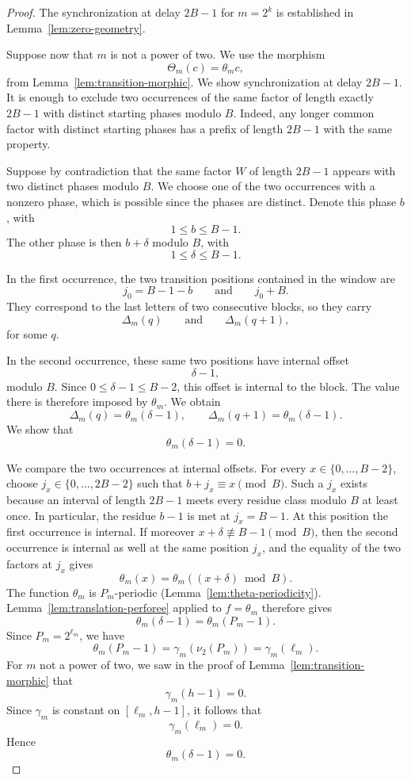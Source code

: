 \documentclass[12pt,reqno]{article}
\theoremstyle{plain}
\theoremstyle{definition}
\begin{document}
\begin{proof}
The synchronization at delay $2B - 1$ for $m = 2^k$ is established in Lemma~\ref{lem:zero-geometry}.

Suppose now that $m$ is not a power of two. We use the morphism
\[
  \Theta_m(c) = \theta_m c,
\]
from Lemma~\ref{lem:transition-morphic}. We show synchronization at delay $2B - 1$. It is enough to exclude two occurrences of the same factor of length exactly $2B - 1$ with distinct starting phases modulo $B$. Indeed, any longer common factor with distinct starting phases has a prefix of length $2B - 1$ with the same property.

Suppose by contradiction that the same factor $W$ of length $2B - 1$ appears with two distinct phases modulo $B$. We choose one of the two occurrences with a nonzero phase, which is possible since the phases are distinct. Denote this phase $b$, with
\[
  1 \le b \le B - 1.
\]
The other phase is then $b + \delta$ modulo $B$, with
\[
  1 \le \delta \le B - 1.
\]

In the first occurrence, the two transition positions contained in the window are
\[
  j_0 = B - 1 - b \qquad\text{and}\qquad j_0 + B.
\]
They correspond to the last letters of two consecutive blocks, so they carry
\[
  \Delta_m(q) \qquad\text{and}\qquad \Delta_m(q + 1),
\]
for some $q$.

In the second occurrence, these same two positions have internal offset
\[
  \delta - 1,
\]
modulo $B$. Since $0 \le \delta - 1 \le B - 2$, this offset is internal to the block. The value there is therefore imposed by $\theta_m$. We obtain
\[
  \Delta_m(q) = \theta_m(\delta - 1), \qquad \Delta_m(q + 1) = \theta_m(\delta - 1).
\]
We show that
\[
  \theta_m(\delta - 1) = 0.
\]

We compare the two occurrences at internal offsets. For every $x \in \{0, \dots, B - 2\}$, choose $j_x \in \{0, \dots, 2B - 2\}$ such that $b + j_x \equiv x \pmod B$. Such a $j_x$ exists because an interval of length $2B - 1$ meets every residue class modulo $B$ at least once. In particular, the residue $b - 1$ is met at $j_x = B - 1$. At this position the first occurrence is internal. If moreover $x + \delta \not\equiv B - 1 \pmod B$, then the second occurrence is internal as well at the same position $j_x$, and the equality of the two factors at $j_x$ gives
\[
  \theta_m(x) = \theta_m((x + \delta) \bmod B).
\]
The function $\theta_m$ is $P_m$-periodic (Lemma~\ref{lem:theta-periodicity}). Lemma~\ref{lem:translation-perforee} applied to $f = \theta_m$ therefore gives
\[
  \theta_m(\delta - 1) = \theta_m(P_m - 1).
\]
Since $P_m = 2^{\ell_m}$, we have
\[
  \theta_m(P_m - 1) = \gamma_m(\nu_2(P_m)) = \gamma_m(\ell_m).
\]
For $m$ not a power of two, we saw in the proof of Lemma~\ref{lem:transition-morphic} that
\[
  \gamma_m(h - 1) = 0.
\]
Since $\gamma_m$ is constant on $[\ell_m, h - 1]$, it follows that
\[
  \gamma_m(\ell_m) = 0.
\]
Hence
\[
  \theta_m(\delta - 1) = 0.
\]


\end{proof}
\end{document}
